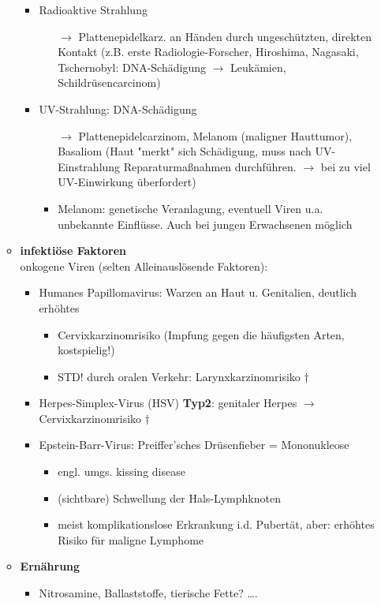 \begin{itemize}
\begin{itemize}
						\begin{itemize}
							\item Radioaktive Strahlung
								\begin{itemize}
									\item[$\rightarrow$] Plattenepidelkarz. an Händen durch ungeschützten, direkten Kontakt (z.B. erste Radiologie-Forscher, Hiroshima, Nagasaki, Tschernobyl: DNA-Schädigung $\rightarrow$ Leukämien, Schildrüsencarcinom)
								\end{itemize}
							\item UV-Strahlung: DNA-Schädigung
								\begin{itemize}
									\item[$\rightarrow$] Plattenepidelcarzinom, Melanom (maligner Hauttumor), Basaliom (Haut "merkt" sich Schädigung, muss nach UV-Einstrahlung Reparaturmaßnahmen durchführen. $\rightarrow$ bei zu viel UV-Einwirkung überfordert)
									\item Melanom: genetische Veranlagung, eventuell Viren u.a. unbekannte Einflüsse. Auch bei jungen Erwachsenen möglich
								\end{itemize}		  
						\end{itemize}
					
					\item \textbf{infektiöse Faktoren}\\
						 onkogene Viren (selten Alleinauslösende Faktoren):
						\begin{itemize}
							\item Humanes Papillomavirus: Warzen an Haut u. Genitalien, deutlich erhöhtes 
								\begin{itemize}
									\item Cervixkarzinomrisiko (Impfung gegen die häufigsten Arten, kostspielig!)
									\item STD! durch oralen Verkehr: Larynxkarzinomrisiko $\dagger$
								\end{itemize}
							\item Herpes-Simplex-Virus (HSV) \textbf{Typ2}: genitaler Herpes $\rightarrow$ Cervixkarzinomrisiko $\dagger$
							\item Epstein-Barr-Virus: Preiffer'sches Drüsenfieber = Mononukleose
								\begin{itemize}
									\item engl. umgs. kissing disease
									\item (sichtbare) Schwellung der Hals-Lymphknoten
									\item meist komplikationslose Erkrankung i.d. Pubertät, aber: erhöhtes Risiko für maligne Lymphome
								\end{itemize}
						\end{itemize}
					\item \textbf{Ernährung}
						\begin{itemize}
							\item Nitrosamine, Ballaststoffe, tierische Fette? ….
						\end{itemize}
				\end{itemize}
		\end{itemize}
